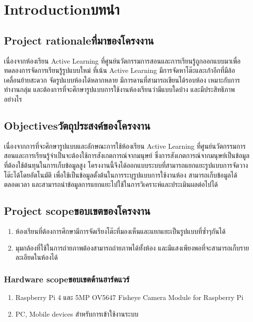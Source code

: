 \chapter{\ifenglish Introduction\else บทนำ\fi}

\section{\ifenglish Project rationale\else ที่มาของโครงงาน\fi}
เนื่องจากห้องเรียน Active Learning ที่ศูนย์นวัตกรรมการสอนและการเรียนรู้ถูกออกแบบมาเพื่อทดลองการจัดการเรียนรู้รูปแบบใหม่
\enskip ที่เน้น Active Learning มีการจัดหาโต๊ะและเก้าอีกที่มีล้อเคลื่อนย้ายสะดวก จัดรูปแบบห้องได้หลากหลาย มีการดานที่สามารถเขียนได้รอบห้อง เหมาะกับการทำงานกลุ่ม
\enskip และต้องการที่จะศึกษารูปแบบการใช้งานห้องเรียนว่ามีแบบใดบ้าง และมีประสิทธิภาพอย่างไร
\section{\ifenglish Objectives\else วัตถุประสงค์ของโครงงาน\fi}
เนื่องจากการที่จะศึกษารูปแบบและลักษณะการใช้ห้องเรียน Active Learning ที่ศูนย์นวัตกรรมการสอนและการเรียนรู้จำเป็นจะต้องใช้การสังเกตการณ์จากมนุษย์
\enskip ซึ่งการสังเกตการณ์จากมนุษย์เป็นข้อมูลที่ต้องใช้ต้นทุนในการเก็บข้อมูลสูง
\enskip โครงงานนี้จึงได้ออกแบบระบบที่สามารถแยกแยะรูปแบบการจัดวางโต๊ะได้โดยอัตโนมัติ เพื่อใช้เป็นข้อมูลตั้งต้นในการระบุรูปแบบการใช้งานห้อง
\enskip สามารถเก็บข้อมูลได้ตลอดเวลา และสามารถนำข้อมูลการแยกแยะไปใช้ในการวิเคราะห์และประเมินผลต่อไปได้

\section{\ifenglish Project scope\else ขอบเขตของโครงงาน\fi}
    \begin{enumerate}
        \item ห้องเรียนที่ต้องการศึกษามีการจัดเรียงโต๊ะที่มองเห็นและแยกแยะเป็นรูปแบบที่ซ้ำๆกันได้
        \item มุมกล้องที่ใช้ในการถ่ายภาพต้องสามารถถ่ายภาพได้ทั้งห้อง และมีแสงเพียงพอที่จะสามารถเก็บรายละเอียดในห้องได้
    \end{enumerate}
\subsection{\ifenglish Hardware scope\else ขอบเขตด้านฮาร์ดแวร์\fi}
    \begin{enumerate}
        \item Raspberry Pi 4 และ 5MP OV5647 Fisheye Camera Module for Raspberry Pi
        \item PC, Mobile devices สำหรับการเข้าใช้งานระบบ
    \end{enumerate}
